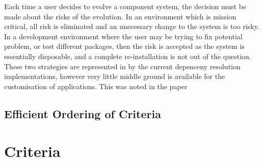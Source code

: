 
Each time a user decides to evolve a component system, the decision must be made about the risks of the evolution.
In an environment which is mission critical, all risk is eliminated and an unecessary change to the system is too risky.
In a development environment where the user may be trying to fix potential problem, 
or test different packages, then the risk is accepted as the system is essentially disposable, and a complete re-installation is not out of the question.
These two strategies are represented in by the current depenceny resolution implementations, however very little middle ground is available for the customisation of applications.
This was noted in the paper %


\subsection{Efficient Ordering of Criteria}



\section{Criteria}

